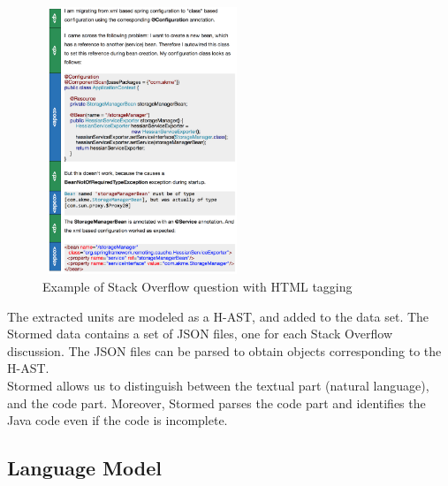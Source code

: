 \documentclass[12pt,mscthesis]{usiinfthesis}
\begin{document}
	\begin{figure}[htbp]
	 \centering
	\includegraphics[width=6cm,height=8cm]{stackOverflow}
	\caption{Example of Stack Overflow question with HTML tagging}
	\label{stackOverflow}
	\end{figure}


	The extracted units are modeled as a H-AST, and added to the data set. The Stormed data contains a set of JSON files, one for each Stack Overflow discussion. The JSON files can be parsed to obtain objects corresponding to the H-AST. \\

	
	Stormed allows us to distinguish between the textual part (natural language), and the code part. Moreover, Stormed parses the code part and identifies the Java code even if the code is incomplete.

	\subsection{Language Model}
\end{document}

